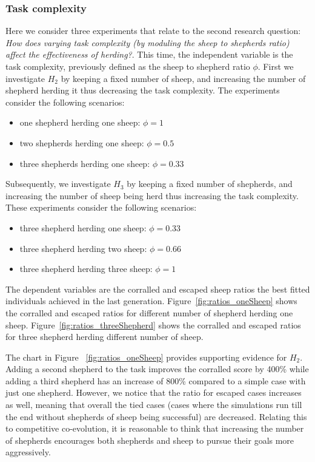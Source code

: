 \documentclass[conference]{IEEEtran}
\begin{document}
\subsubsection{Task complexity}
Here we consider three experiments that relate to the second research question: \textit{How does varying task complexity (by moduling the sheep to shepherds ratio) affect the effectiveness of herding?}. 
This time, the independent variable is the task complexity, previously defined as the sheep to shepherd ratio $\phi$.
 First we investigate $H_2$ by keeping a fixed number of sheep, and increasing the number of shepherd herding it thus decreasing the task complexity. 
 The experiments consider the following scenarios:
\begin{itemize}
	\item one shepherd herding one sheep: $\phi = 1$
	\item two shepherds herding one sheep: $\phi = 0.5$
	\item three shepherds herding one sheep: $\phi = 0.33$
\end{itemize}	

Subsequently, we investigate $H_3$ by keeping a fixed number of shepherds, and increasing the number of sheep being herd thus increasing the task complexity. These experiments consider the following scenarios:
\begin{itemize}
	\item three shepherd herding one sheep: $\phi = 0.33$
	\item three shepherd herding two sheep: $\phi = 0.66$
	\item three shepherd herding three sheep: $\phi = 1$
\end{itemize}
The dependent variables are the corralled and escaped sheep ratios the best fitted individuals achieved in the last generation.
Figure~\ref{fig:ratios_oneSheep} shows the corralled and escaped ratios for different number of shepherd herding one sheep. Figure~\ref{fig:ratios_threeShepherd} shows the corralled and escaped ratios for three shepherd herding different number of sheep. 


The chart in Figure ~\ref{fig:ratios_oneSheep} provides supporting evidence for $H_2$. Adding a second shepherd to the task improves the corralled score by 400\% while adding a third shepherd has an increase of 800\% compared to a simple case with just one shepherd. 
However, we notice that the ratio for escaped cases increases as well, meaning that overall the tied cases (cases where the simulations run till the end without shepherds of sheep being successful) are decreased. 
Relating this to competitive co-evolution, it is reasonable to think that increasing the number of shepherds encourages both shepherds and sheep to pursue their goals more aggressively. %
\end{document}
